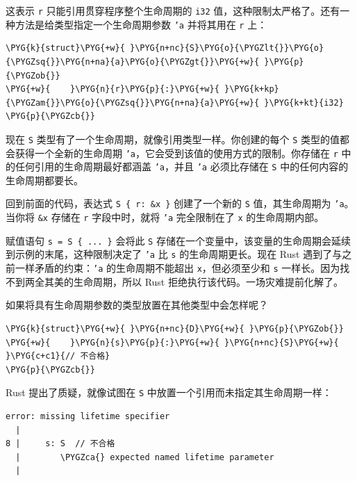 这表示 \texttt{r} 只能引用贯穿程序整个生命周期的 \texttt{i32} 值，这种限制太严格了。还有一种方法是给类型指定一个生命周期参数 \texttt{'a} 并将其用在 \texttt{r} 上：

\begin{Verbatim}[commandchars=\\\{\},breaklines=true,breakanywhere=true,fontsize=\codefont,xleftmargin=17bp]
\PYG{k}{struct}\PYG{+w}{ }\PYG{n+nc}{S}\PYG{o}{\PYGZlt{}}\PYG{o}{\PYGZsq{}}\PYG{n+na}{a}\PYG{o}{\PYGZgt{}}\PYG{+w}{ }\PYG{p}{\PYGZob{}}
\PYG{+w}{    }\PYG{n}{r}\PYG{p}{:}\PYG{+w}{ }\PYG{k+kp}{\PYGZam{}}\PYG{o}{\PYGZsq{}}\PYG{n+na}{a}\PYG{+w}{ }\PYG{k+kt}{i32}
\PYG{p}{\PYGZcb{}}
\end{Verbatim}

现在 \texttt{S} 类型有了一个生命周期，就像引用类型一样。你创建的每个 \texttt{S} 类型的值都会获得一个全新的生命周期 \texttt{'a}，它会受到该值的使用方式的限制。你存储在 \texttt{r} 中的任何引用的生命周期最好都涵盖 \texttt{'a}，并且 \texttt{'a} 必须比存储在 \texttt{S} 中的任何内容的生命周期都要长。

回到前面的代码，表达式 \texttt{S \{ r: \&x \}} 创建了一个新的 \texttt{S} 值，其生命周期为 \texttt{'a}。当你将 \texttt{\&x} 存储在 \texttt{r} 字段中时，就将 \texttt{'a} 完全限制在了 \texttt{x} 的生命周期内部。

赋值语句 \texttt{s = S \{ ... \}} 会将此 \texttt{S} 存储在一个变量中，该变量的生命周期会延续到示例的末尾，这种限制决定了 \texttt{'a} 比 \texttt{s} 的生命周期更长。现在 Rust 遇到了与之前一样矛盾的约束：\texttt{'a} 的生命周期不能超出 \texttt{x}，但必须至少和 \texttt{s} 一样长。因为找不到两全其美的生命周期，所以 Rust 拒绝执行该代码。一场灾难提前化解了。

如果将具有生命周期参数的类型放置在其他类型中会怎样呢？

\begin{Verbatim}[commandchars=\\\{\},breaklines=true,breakanywhere=true,fontsize=\codefont,xleftmargin=17bp]
\PYG{k}{struct}\PYG{+w}{ }\PYG{n+nc}{D}\PYG{+w}{ }\PYG{p}{\PYGZob{}}
\PYG{+w}{    }\PYG{n}{s}\PYG{p}{:}\PYG{+w}{ }\PYG{n+nc}{S}\PYG{+w}{  }\PYG{c+c1}{// 不合格}
\PYG{p}{\PYGZcb{}}
\end{Verbatim}

Rust 提出了质疑，就像试图在 \texttt{S} 中放置一个引用而未指定其生命周期一样：

\begin{Verbatim}[commandchars=\\\{\},breaklines=true,breakanywhere=true,fontsize=\codefont,xleftmargin=17bp]
error: missing lifetime specifier
  |
8 |     s: S  // 不合格
  |        \PYGZca{} expected named lifetime parameter
  |
\end{Verbatim}

